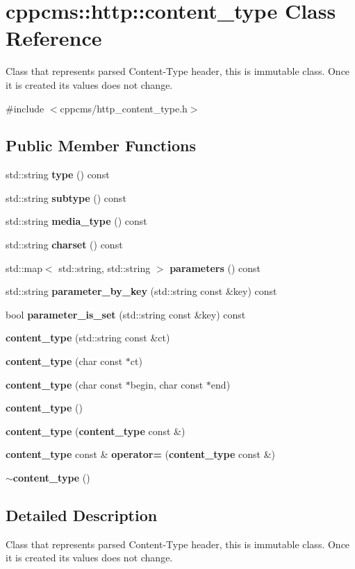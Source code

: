 \section{cppcms\-:\-:http\-:\-:content\-\_\-type \-Class \-Reference}
\label{classcppcms_1_1http_1_1content__type}


\-Class that represents parsed \-Content-\/\-Type header, this is immutable class. \-Once it is created its values does not change.  




{\ttfamily \#include $<$cppcms/http\-\_\-content\-\_\-type.\-h$>$}

\subsection*{\-Public \-Member \-Functions}
\begin{DoxyCompactItemize}
\item 
std\-::string {\bf type} () const 
\item 
std\-::string {\bf subtype} () const 
\item 
std\-::string {\bf media\-\_\-type} () const 
\item 
std\-::string {\bf charset} () const 
\item 
std\-::map$<$ std\-::string, \*
std\-::string $>$ {\bf parameters} () const 
\item 
std\-::string {\bf parameter\-\_\-by\-\_\-key} (std\-::string const \&key) const 
\item 
bool {\bf parameter\-\_\-is\-\_\-set} (std\-::string const \&key) const 
\item 
{\bf content\-\_\-type} (std\-::string const \&ct)
\item 
{\bf content\-\_\-type} (char const $\ast$ct)
\item 
{\bf content\-\_\-type} (char const $\ast$begin, char const $\ast$end)
\item 
{\bf content\-\_\-type} ()
\item 
{\bf content\-\_\-type} ({\bf content\-\_\-type} const \&)
\item 
{\bf content\-\_\-type} const \& {\bf operator=} ({\bf content\-\_\-type} const \&)
\item 
{\bf $\sim$content\-\_\-type} ()
\end{DoxyCompactItemize}


\subsection{\-Detailed \-Description}
\-Class that represents parsed \-Content-\/\-Type header, this is immutable class. \-Once it is created its values does not change. 

